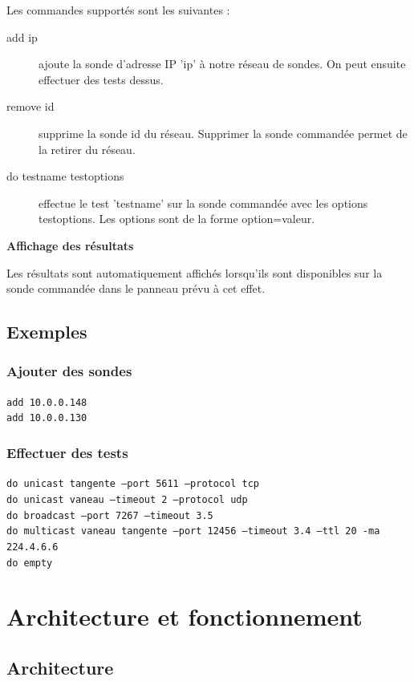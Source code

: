 \documentclass[a4paper,11pt]{article}
\begin{document}
Les commandes supportés sont les suivantes :
\begin{description}
\item[add ip] ajoute la sonde d'adresse IP 'ip' à notre réseau de sondes. On peut ensuite effectuer des tests dessus.
\item[remove id] supprime la sonde id du réseau. Supprimer la sonde commandée permet de la retirer du réseau.
\item[do testname testoptions] effectue le test 'testname' sur la sonde commandée avec les options testoptions. Les options sont de la forme option=valeur.
\end{description}
\vspace{2ex}
\textbf{Affichage des résultats}

Les résultats sont automatiquement affichés lorsqu'ils sont disponibles sur la sonde commandée dans le panneau prévu à cet effet.


\subsection{Exemples}
\subsubsection{Ajouter des sondes}
\texttt{add 10.0.0.148}\\
\indent\texttt{add 10.0.0.130}

\subsubsection{Effectuer des tests}
\texttt{do unicast tangente --port 5611 --protocol tcp}\\
\indent\texttt{do unicast vaneau --timeout 2 --protocol udp}\\
\indent\texttt{do broadcast --port 7267 --timeout 3.5 }\\
\indent\texttt{do multicast vaneau tangente --port 12456 --timeout 3.4 --ttl 20 -ma 224.4.6.6}\\
\indent\texttt{do empty}

\section{Architecture et fonctionnement}


\subsection{Architecture}
\end{document}

